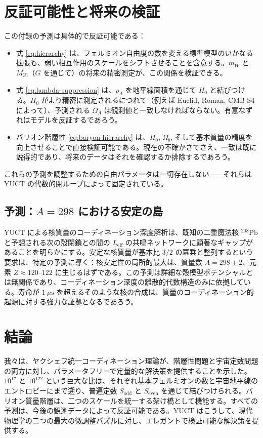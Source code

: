 \documentclass[11pt,a4paper]{article}
\theoremstyle{remark}
\begin{document}
	\section{反証可能性と将来の検証}
	
	この付録の予測は具体的で反証可能である：
	\begin{itemize}
		\item 式 \eqref{eq:hierarchy} は、フェルミオン自由度の数を変える標準模型のいかなる拡張も、弱い相互作用のスケールをシフトさせることを含意する。\(m_W\) と \(M_{\mathrm{Pl}}\)（\(G\) を通じて）の将来の精密測定が、この関係を検証できる。
		\item 式 \eqref{eq:lambda-suppression} は、\(\rho_\Lambda\) を地平線面積を通じて \(H_0\) と結びつける。\(H_0\) がより精密に測定されるにつれて（例えば Euclid, Roman, CMB‑S4 によって）、予測される \(\Omega_\Lambda\) は観測値と一致しなければならない。有意なずれはモデルを反証するであろう。
		\item バリオン階層性 \eqref{eq:baryon-hierarchy} は、\(H_0\), \(\Omega_b\), そして基本質量の精度を向上させることで直接検証可能である。現在の不確かさでさえ、一致は既に説得的であり、将来のデータはそれを確認するか排除するであろう。
	\end{itemize}
	これらの予測を調整するための自由パラメータは一切存在しない――それらは YUCT の代数的閉ループによって固定されている。
	
	\subsection{予測：\(A=298\) における安定の島}
	
	YUCT による核質量のコーディネーション深度解析は、既知の二重魔法核 \(^{208}\mathrm{Pb}\) と予想される次の殻閉鎖との間の \(L_{\mathrm{eff}}\) の共鳴ネットワークに顕著なギャップがあることを明らかにする。安定な核質量が基本比 \(3/2\) の冪乗と整列するという要求は、特定の予測に導く：核安定性の局所的最大は、質量数 \(A = 298 \pm 2\)、元素 \(Z \approx 120\)--\(122\) に生じるはずである。この予測は詳細な殻模型ポテンシャルとは無関係であり、コーディネーション深度の離散的代数構造のみに依拠している。寿命が \(1\ \mu\text{s}\) を超えるそのような核の合成は、質量のコーディネーション的起源に対する強力な証拠となるであろう。
	
	\section{結論}
	
	我々は、ヤクシェフ統一コーディネーション理論が、階層性問題と宇宙定数問題の両方に対し、パラメータフリーで定量的な解決策を提供することを示した。\(10^{17}\) と \(10^{122}\) という巨大な比は、それぞれ基本フェルミオンの数と宇宙地平線のエントロピーにまで遡り、普遍定数 \(S_{\mathrm{odd}}\) と \(S_{\mathrm{even}}\) を通じて結びつけられる。バリオン質量階層は、二つのスケールを統一する架け橋として機能する。すべての予測は、今後の観測データによって反証可能である。YUCT はこうして、現代物理学の二つの最大の微調整パズルに対し、エレガントで検証可能な解決策を提供する。
	
\end{document}

